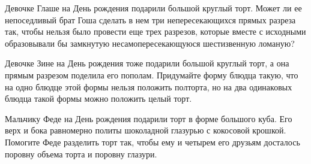 ﻿
\begin{itemize}

\itA Девочке Глаше на День рождения подарили большой круглый торт. Может ли ее непоседливый брат Гоша сделать в нем три непересекающихся прямых разреза так, чтобы нельзя было провести еще трех разрезов, которые вместе с исходными образовывали бы замкнутую несамопересекающуюся шестизвенную ломаную?

\itB Девочке Зине на День рождения тоже подарили большой круглый торт, а она прямым разрезом поделила его пополам. Придумайте форму блюдца такую, что на одно блюдце этой формы нельзя положить полторта, но на два одинаковых блюдца такой формы можно положить целый торт.

\itC Мальчику Феде на День рождения подарили торт в форме большого куба. Его верх и бока равномерно политы шоколадной глазурью с кокосовой крошкой. Помогите Феде разделить торт так, чтобы ему и четырем его друзьям досталось поровну объема торта и поровну глазури.
\end{itemize}